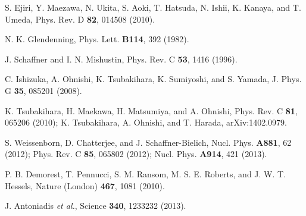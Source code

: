 \documentclass[prd,superscriptaddress,unsortedaddress,
twocolumn,showpacs,preprintnumbers,amsmath,amssymb]{revtex4}
\begin{document}
\begin{thebibliography}{99}
         S. Ejiri, Y. Maezawa, N. Ukita, S. Aoki,
         T. Hatsuda, N. Ishii, K. Kanaya,
         and T. Umeda,
         Phys. Rev. D \textbf{82}, 014508 (2010).

         N. K. Glendenning,
         Phys. Lett. \textbf{B114}, 392 (1982).

         J. Schaffner and I. N. Mishustin,
         Phys. Rev. C \textbf{53}, 1416 (1996).

         C. Ishizuka, A. Ohnishi, K. Tsubakihara,
         K. Sumiyoshi, and S. Yamada,
         J. Phys. G \textbf{35}, 085201 (2008).

         K. Tsubakihara, H. Maekawa, H. Matsumiya, and A. Ohnishi,
         Phys. Rev. C \textbf{81}, 065206 (2010);
         K. Tsubakihara, A. Ohnishi, and T. Harada, arXiv:1402.0979.

         S. Weissenborn, D. Chatterjee, and J. Schaffner-Bielich,
         Nucl. Phys. \textbf{A881}, 62 (2012);
         Phys. Rev. C \textbf{85}, 065802 (2012);
         Nucl. Phys. \textbf{A914}, 421 (2013).

         P. B. Demorest, T. Pennucci, S. M. Ransom, M. S. E. Roberts,
         and J. W. T. Hessels,
         Nature (London) \textbf{467}, 1081 (2010). 

        J. Antoniadis \textit{et al.}, Science \textbf{340}, 1233232 (2013). 
         

\end{thebibliography}
\end{document}
